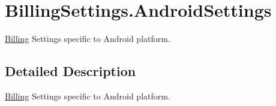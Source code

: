 \hypertarget{class_voxel_busters_1_1_native_plugins_1_1_billing_settings_1_1_android_settings}{}\section{Billing\+Settings.\+Android\+Settings}
\label{class_voxel_busters_1_1_native_plugins_1_1_billing_settings_1_1_android_settings}


\hyperlink{class_voxel_busters_1_1_native_plugins_1_1_billing}{Billing} Settings specific to Android platform.  




\subsection{Detailed Description}
\hyperlink{class_voxel_busters_1_1_native_plugins_1_1_billing}{Billing} Settings specific to Android platform. 

